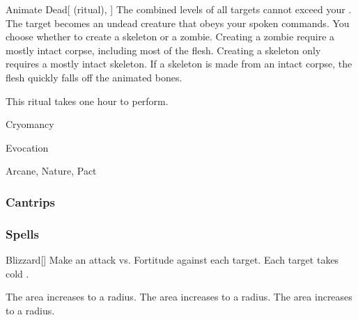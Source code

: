 \lowercase{\hypertarget{spell:Animate Dead}{}}\label{spell:Animate Dead}
\begin{attuneability}[Rank 3]{\hypertarget{spell:Animate Dead}{Animate Dead}}[ (ritual), ]
The combined levels of all targets cannot exceed your .
The target becomes an undead creature that obeys your spoken commands.
You choose whether to create a skeleton or a zombie.
Creating a zombie require a mostly intact corpse, including most of the flesh.
Creating a skeleton only requires a mostly intact skeleton.
If a skeleton is made from an intact corpse, the flesh quickly falls off the animated bones.

This ritual takes one hour to perform.
\end{attuneability}
\vspace{0.25em}


\newpage
\begin{spellsection}{Cryomancy}

\begin{spellheader}
\end{spellheader}


 Evocation

 Arcane, Nature, Pact

\subsubsection{Cantrips}


\end{spellsection}


\subsubsection{Spells}


\lowercase{\hypertarget{spell:Blizzard}{}}\label{spell:Blizzard}
\begin{freeability}[Rank 1]{\hypertarget{spell:Blizzard}{Blizzard}}[]
Make an attack vs. Fortitude against each target.
\hit Each target takes cold .

\rankline
{} The area increases to a \areamed radius.
 The area increases to a \arealarge radius.
 The area increases to a \areahuge radius.
\end{freeability}
\vspace{0.25em}



